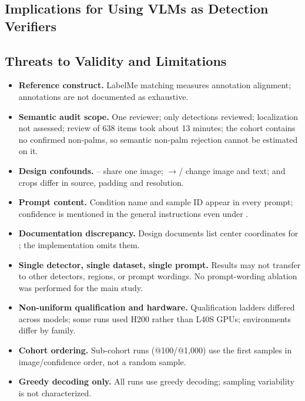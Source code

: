 \subsection{Implications for Using VLMs as Detection Verifiers}

\subsection{Threats to Validity and Limitations}
\label{sec:discussion:limitations}
\begin{itemize}
  \item \textbf{Reference construct.} LabelMe matching measures annotation alignment; annotations are not documented as exhaustive.
  \item \textbf{Semantic audit scope.} One reviewer; only \unmatched{} detections reviewed; localization not assessed; review of 638 items took about 13 minutes; the cohort contains no confirmed non-palms, so semantic non-palm rejection cannot be estimated on it.
  \item \textbf{Design confounds.} -- share one image; $\rightarrow$/ change image and text;  and  crops differ in source, padding and resolution.
  \item \textbf{Prompt content.} Condition name and sample ID appear in every prompt; confidence is mentioned in the general instructions even under .
  \item \textbf{Documentation discrepancy.} Design documents list center coordinates for ; the implementation omits them.
  \item \textbf{Single detector, single dataset, single prompt.} Results may not transfer to other detectors, regions, or prompt wordings. No prompt-wording ablation was performed for the main study. 
  \item \textbf{Non-uniform qualification and hardware.} Qualification ladders differed across models; some runs used H200 rather than L40S GPUs; environments differ by family.
  \item \textbf{Cohort ordering.} Sub-cohort runs (@100/@1{,}000) use the first samples in image/confidence order, not a random sample.
  \item \textbf{Greedy decoding only.} All runs use greedy decoding; sampling variability is not characterized. 
\end{itemize}
